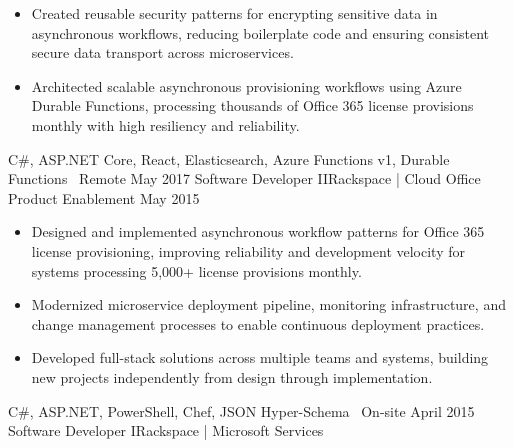 \begin{experiences}
{\begin{itemize}
                              designing and implementing Elasticsearch write-through
                              cache for Microsoft APIs, dramatically enhancing user
                              experience and system responsiveness.
                        \item Created reusable security patterns for encrypting
                              sensitive data in asynchronous workflows, reducing
                              boilerplate code and ensuring consistent secure data
                              transport across microservices.
                        \item Architected scalable asynchronous provisioning workflows
                              using Azure Durable Functions, processing thousands of
                              Office 365 license provisions monthly with high
                              resiliency and reliability.
                      \end{itemize}
                    }
                    {C\#, ASP.NET Core, React, Elasticsearch, Azure Functions v1, Durable Functions}
                    {\faHome\ Remote}
\ifcv
  \emptySeparator
  \experience
    {May 2017}     {Software Developer II}{Rackspace | Cloud Office Product Enablement}
    {May 2015}     {
                      \begin{itemize}
                        \item Designed and implemented asynchronous workflow patterns
                              for Office 365 license provisioning, improving reliability
                              and development velocity for systems processing 5,000+
                              license provisions monthly.
                        \item Modernized microservice deployment pipeline, monitoring
                              infrastructure, and change management processes to enable
                              continuous deployment practices.
                        \item Developed full-stack solutions across multiple teams and
                              systems, building new projects independently from design
                              through implementation.
                      \end{itemize}
                    }
                    {C\#, ASP.NET, PowerShell, Chef, JSON Hyper-Schema}
                    {\faBuilding\ On-site}
\fi
  \emptySeparator
  \experience
  {April 2015}       {Software Developer I}{Rackspace | Microsoft Services}

\end{experiences}
